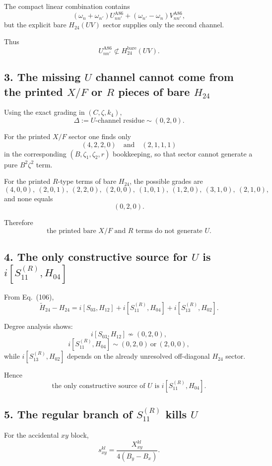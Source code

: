 \documentclass[11pt]{article}
\begin{document}
The compact linear combination contains
\[
(\omega_n+\omega_{n'})U_{nn'}^{\mathrm{A86}}
+
(\omega_{n'}-\omega_n)V_{nn'}^{\mathrm{A86}},
\]
but the explicit bare \(H_{24}(UV)\) sector supplies only the second channel.

Thus
\[
\boxed{U_{nn'}^{\mathrm{A86}}\not\subset H_{24}^{\mathrm{bare}}(UV).}
\]

\subsection*{3. The missing \(U\) channel cannot come from the printed \(X/F\) or \(R\) pieces of bare \(H_{24}\)}

Using the exact grading in \((C,\zeta,k_4)\),
\[
\Delta := U\text{-channel residue} \sim (0,2,0).
\]

For the printed \(X/F\) sector one finds only
\[
(4,2,2,0)\quad\text{and}\quad(2,1,1,1)
\]
in the corresponding \((B,\zeta_1,\zeta_2,r)\) bookkeeping, so that sector cannot generate a pure \(B^2\zeta^2\) term.

For the printed \(R\)-type terms of bare \(H_{24}\), the possible grades are
\[
(4,0,0),\ (2,0,1),\ (2,2,0),\ (2,0,0),\ (1,0,1),\ (1,2,0),\ (3,1,0),\ (2,1,0),
\]
and none equals
\[
(0,2,0).
\]

Therefore
\[
\boxed{\text{the printed bare }X/F\text{ and }R\text{ terms do not generate }U.}
\]

\subsection*{4. The only constructive source for \(U\) is \(i[S_{11}^{(R)},H_{04}]\)}

From Eq.~(106),
\[
\widetilde H_{24}-H_{24}
=
i[S_{03},H_{12}]
+i[S_{11}^{(R)},H_{04}]
+i[S_{13}^{(R)},H_{02}].
\]

Degree analysis shows:
\[
i[S_{03},H_{12}] \not\sim (0,2,0),
\]
\[
i[S_{11}^{(R)},H_{04}] \sim (0,2,0)\ \text{or}\ (2,0,0),
\]
while \(i[S_{13}^{(R)},H_{02}]\) depends on the already unresolved off-diagonal \(H_{24}\) sector.

Hence
\[
\boxed{\text{the only constructive source of }U\text{ is }i[S_{11}^{(R)},H_{04}].}
\]

\subsection*{5. The regular branch of \(S_{11}^{(R)}\) kills \(U\)}

For the accidental \(xy\) block,
\[
s_{xy}^{kl}=\frac{X_{xy}^{kl}}{4(B_y-B_x)}.
\]
\end{document}
